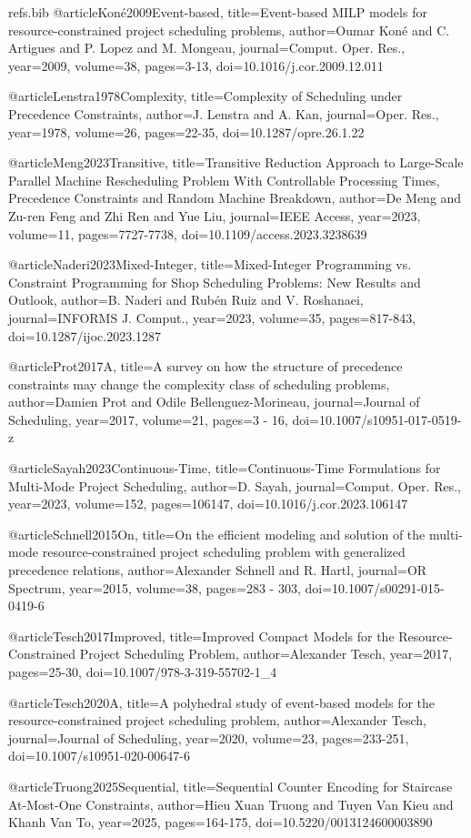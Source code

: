 \begin{filecontents}{refs.bib}
@article{Koné2009Event-based,
title={Event-based MILP models for resource-constrained project scheduling problems},
author={Oumar Koné and C. Artigues and P. Lopez and M. Mongeau},
journal={Comput. Oper. Res.},
year={2009},
volume={38},
pages={3-13},
doi={10.1016/j.cor.2009.12.011}
}

@article{Lenstra1978Complexity,
title={Complexity of Scheduling under Precedence Constraints},
author={J. Lenstra and A. Kan},
journal={Oper. Res.},
year={1978},
volume={26},
pages={22-35},
doi={10.1287/opre.26.1.22}
}

@article{Meng2023Transitive,
title={Transitive Reduction Approach to Large-Scale Parallel Machine Rescheduling Problem With Controllable Processing Times, Precedence Constraints and Random Machine Breakdown},
author={De Meng and Zu-ren Feng and Zhi Ren and Yue Liu},
journal={IEEE Access},
year={2023},
volume={11},
pages={7727-7738},
doi={10.1109/access.2023.3238639}
}

@article{Naderi2023Mixed-Integer,
title={Mixed-Integer Programming vs. Constraint Programming for Shop Scheduling Problems: New Results and Outlook},
author={B. Naderi and Rubén Ruiz and V. Roshanaei},
journal={INFORMS J. Comput.},
year={2023},
volume={35},
pages={817-843},
doi={10.1287/ijoc.2023.1287}
}

@article{Prot2017A,
title={A survey on how the structure of precedence constraints may change the complexity class of scheduling problems},
author={Damien Prot and Odile Bellenguez-Morineau},
journal={Journal of Scheduling},
year={2017},
volume={21},
pages={3 - 16},
doi={10.1007/s10951-017-0519-z}
}

@article{Sayah2023Continuous-Time,
title={Continuous-Time Formulations for Multi-Mode Project Scheduling},
author={D. Sayah},
journal={Comput. Oper. Res.},
year={2023},
volume={152},
pages={106147},
doi={10.1016/j.cor.2023.106147}
}

@article{Schnell2015On,
title={On the efficient modeling and solution of the multi-mode resource-constrained project scheduling problem with generalized precedence relations},
author={Alexander Schnell and R. Hartl},
journal={OR Spectrum},
year={2015},
volume={38},
pages={283 - 303},
doi={10.1007/s00291-015-0419-6}
}

@article{Tesch2017Improved,
title={Improved Compact Models for the Resource-Constrained Project Scheduling Problem},
author={Alexander Tesch},
year={2017},
pages={25-30},
doi={10.1007/978-3-319-55702-1_4}
}

@article{Tesch2020A,
title={A polyhedral study of event-based models for the resource-constrained project scheduling problem},
author={Alexander Tesch},
journal={Journal of Scheduling},
year={2020},
volume={23},
pages={233-251},
doi={10.1007/s10951-020-00647-6}
}

@article{Truong2025Sequential,
title={Sequential Counter Encoding for Staircase At-Most-One Constraints},
author={Hieu Xuan Truong and Tuyen Van Kieu and Khanh Van To},
year={2025},
pages={164-175},
doi={10.5220/0013124600003890}
}
\end{filecontents}

